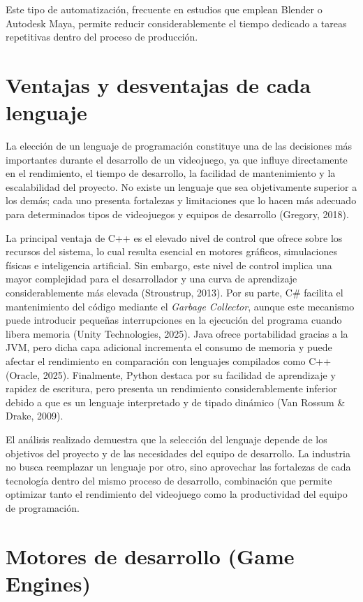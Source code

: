 \documentclass[12pt]{report}
\begin{document}
Este tipo de automatización, frecuente en estudios que emplean Blender o Autodesk Maya, permite reducir considerablemente el tiempo dedicado a tareas repetitivas dentro del proceso de producción.

\section{Ventajas y desventajas de cada lenguaje}

La elección de un lenguaje de programación constituye una de las decisiones más importantes durante el desarrollo de un videojuego, ya que influye directamente en el rendimiento, el tiempo de desarrollo, la facilidad de mantenimiento y la escalabilidad del proyecto. No existe un lenguaje que sea objetivamente superior a los demás; cada uno presenta fortalezas y limitaciones que lo hacen más adecuado para determinados tipos de videojuegos y equipos de desarrollo (Gregory, 2018).

La principal ventaja de C++ es el elevado nivel de control que ofrece sobre los recursos del sistema, lo cual resulta esencial en motores gráficos, simulaciones físicas e inteligencia artificial. Sin embargo, este nivel de control implica una mayor complejidad para el desarrollador y una curva de aprendizaje considerablemente más elevada (Stroustrup, 2013). Por su parte, C\# facilita el mantenimiento del código mediante el \textit{Garbage Collector}, aunque este mecanismo puede introducir pequeñas interrupciones en la ejecución del programa cuando libera memoria (Unity Technologies, 2025). Java ofrece portabilidad gracias a la JVM, pero dicha capa adicional incrementa el consumo de memoria y puede afectar el rendimiento en comparación con lenguajes compilados como C++ (Oracle, 2025). Finalmente, Python destaca por su facilidad de aprendizaje y rapidez de escritura, pero presenta un rendimiento considerablemente inferior debido a que es un lenguaje interpretado y de tipado dinámico (Van Rossum \& Drake, 2009).

El análisis realizado demuestra que la selección del lenguaje depende de los objetivos del proyecto y de las necesidades del equipo de desarrollo. La industria no busca reemplazar un lenguaje por otro, sino aprovechar las fortalezas de cada tecnología dentro del mismo proceso de desarrollo, combinación que permite optimizar tanto el rendimiento del videojuego como la productividad del equipo de programación.

\section{Motores de desarrollo (Game Engines)}
\end{document}
